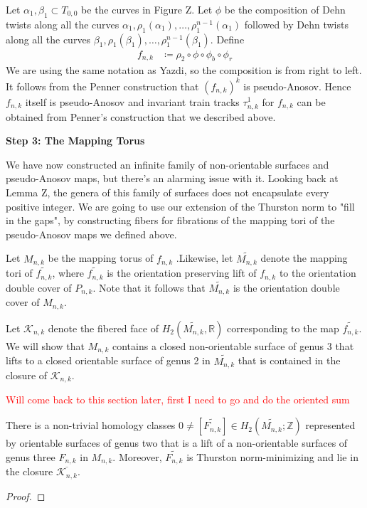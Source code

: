 Let $\alpha_1,\beta_1 \subset T_{0,0}$ be the curves in Figure Z. Let $\phi$ be the composition of Dehn twists along all the curves $\alpha_1, \rho_1(\alpha_1), \dots, \rho_1^{n-1}(\alpha_1)$ followed by Dehn twists along all the curves $\beta_1,\rho_1(\beta_1),\dots,\rho_1^{n-1}(\beta_1)$. Define
\begin{align*}
    f_{n,k} &\coloneqq \rho_2 \circ \phi \circ \phi_b \circ \phi_r
\end{align*}
We are using the same notation as Yazdi, so the composition is from right to left. It follows from the Penner construction that $(f_{n,k})^k$ is pseudo-Anosov. Hence $f_{n,k}$ itself is pseudo-Anosov and invariant train tracks $\tau^1_{n,k}$ for $f_{n,k}$ can be obtained from Penner's construction that we described above.

\begin{center}
\textbf{Step 3: The Mapping Torus}
\end{center}

We have now constructed an infinite family of non-orientable surfaces and pseudo-Anosov maps, but there's an alarming issue with it. Looking back at Lemma Z, the genera of this family of surfaces does not encapsulate every positive integer. We are going to use our extension of the Thurston norm to "fill in the gaps", by constructing fibers for fibrations of the mapping tori of the pseudo-Anosov maps we defined above.

Let $M_{n,k}$ be the mapping torus of $f_{n,k}$ .Likewise, let $\widetilde{M_{n,k}}$ denote the mapping tori of $\widetilde{f_{n,k}}$, where $\widetilde{f_{n,k}}$ is the orientation preserving lift of $f_{n,k}$ to the orientation double cover of $P_{n,k}$. Note that it follows that $\widetilde{M_{n,k}}$ is the orientation double cover of $M_{n,k}$.

Let $\mathcal{K}_{n,k}$ denote the fibered face of $H_2(\widetilde{M_{n,k}},\mathbb{R})$ corresponding to the map $\widetilde{f_{n,k}}$. We will show that $M_{n,k}$ contains a closed non-orientable surface of genus 3 that lifts to a closed orientable surface of genus 2 in $\widetilde{M_{n,k}}$ that is contained in the closure of $\mathcal{K}_{n,k}$.

\textcolor{red}{Will come back to this section later, first I need to go and do the oriented sum}

\begin{lem}
\label{lem:genus3}
There is a non-trivial homology classes $0 \neq [\widetilde{F_{n,k}}] \in H_2(\widetilde{M_{n,k}};\mathbb{Z})$ represented by orientable surfaces of genus two that is a lift of a non-orientable surfaces of genus three $F_{n,k}$ in $M_{n,k}$. Moreover, $\widetilde{F_{n,k}}$ is Thurston norm-minimizing and lie in the closure $\overline{\mathcal{K}_{n,k}}$.
\end{lem}
\begin{proof}

\end{proof}

